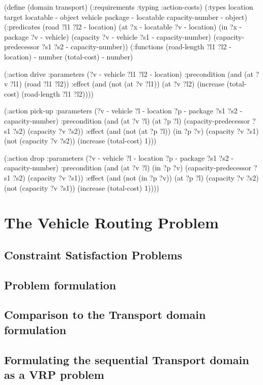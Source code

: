 \begin{code}
(define (domain transport)
  (:requirements :typing :action-costs)
  (:types
        location target locatable - object
        vehicle package - locatable
        capacity-number - object)
  (:predicates 
     (road ?l1 ?l2 - location)
     (at ?x - locatable ?v - location)
     (in ?x - package ?v - vehicle)
     (capacity ?v - vehicle ?s1 - capacity-number)
     (capacity-predecessor ?s1 ?s2 - capacity-number))
  (:functions
     (road-length ?l1 ?l2 - location) - number
     (total-cost) - number)
     
  (:action drive
    :parameters (?v - vehicle ?l1 ?l2 - location)
    :precondition (and (at ?v ?l1) (road ?l1 ?l2))
    :effect (and (not (at ?v ?l1)) (at ?v ?l2)
        (increase (total-cost) (road-length ?l1 ?l2))))
        
 (:action pick-up
    :parameters (?v - vehicle ?l - location ?p - package
                 ?s1 ?s2 - capacity-number)
    :precondition (and (at ?v ?l) (at ?p ?l)
        (capacity-predecessor ?s1 ?s2) (capacity ?v ?s2))
    :effect (and (not (at ?p ?l)) (in ?p ?v) (capacity ?v ?s1)
        (not (capacity ?v ?s2)) (increase (total-cost) 1)))
        
  (:action drop
    :parameters (?v - vehicle ?l - location ?p - package
                 ?s1 ?s2 - capacity-number)
    :precondition (and (at ?v ?l) (in ?p ?v)
        (capacity-predecessor ?s1 ?s2) (capacity ?v ?s1))
    :effect (and (not (in ?p ?v)) (at ?p ?l) (capacity ?v ?s2)
        (not (capacity ?v ?s1)) (increase (total-cost) 1))))
\end{code}


\section{The Vehicle Routing Problem}

 \cite{Dantzig1959}

\subsection{Constraint Satisfaction Problems}

\subsection{Problem formulation}

\subsection{Comparison to the Transport domain formulation}

\subsection{Formulating the sequential Transport domain as a VRP problem}

